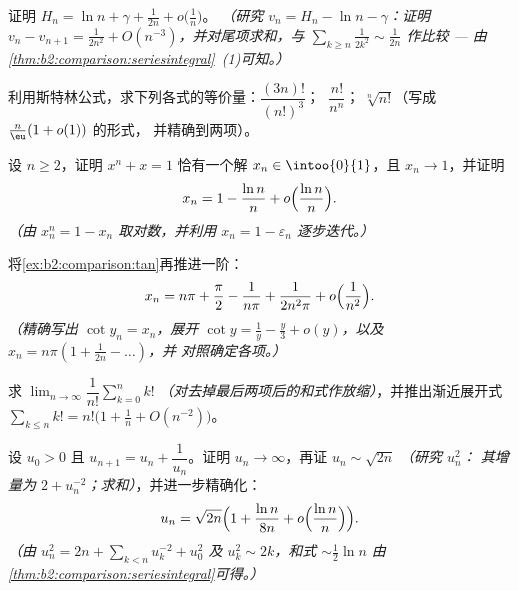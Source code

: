 \begin{exercise}[$\star\star$]\label{exo:b2:comparison:3}
证明 $H_n = \ln n + \gamma + \frac{1}{2n} + o\bigl(\frac1n\bigr)$。
\emph{（研究 $v_n = H_n - \ln n - \gamma$：证明 $v_n - v_{n+1} =
\frac{1}{2n^2} + O(n^{-3})$，并对尾项求和，与
$\sum_{k \geq n} \frac{1}{2k^2} \sim \frac{1}{2n}$ 作比较 ---
由\cref{thm:b2:comparison:seriesintegral}~(1)可知。）}
\end{exercise}

\begin{exercise}[$\star\star$]\label{exo:b2:comparison:4}
利用斯特林公式，求下列各式的等价量：$\dfrac{(3n)!}{(n!)^3}$；
$\;\dfrac{n!}{n^n}$；$\;\sqrt[n]{n!}$（写成 $\frac n\eu(1 + o(1))$ 的形式，
并精确到两项）。
\end{exercise}

\begin{exercise}[$\star\star$]\label{exo:b2:comparison:5}
设 $n \geq 2$，证明 $x^n + x = 1$ 恰有一个解 $x_n
\in \intoo{0}{1}$，且 $x_n \to 1$，并证明
\[
x_n = 1 - \frac{\ln n}{n} + o\Bigl(\frac{\ln n}{n}\Bigr).
\]
\emph{（由 $x_n^n = 1 - x_n$ 取对数，并利用
$x_n = 1 - \varepsilon_n$ 逐步迭代。）}
\end{exercise}

\begin{exercise}[$\star\star$]\label{exo:b2:comparison:6}
将\cref{ex:b2:comparison:tan}再推进一阶：
\[
x_n = n\pi + \frac\pi2 - \frac{1}{n\pi} + \frac{1}{2n^2\pi} +
o\Bigl(\frac{1}{n^2}\Bigr).
\]
\emph{（精确写出 $\cot y_n = x_n$，展开 $\cot y = \frac1y -
\frac y3 + o(y)$，以及 $x_n = n\pi(1 + \frac{1}{2n} - \dots)$，并
对照确定各项。）}
\end{exercise}

\begin{exercise}[$\star\star$]\label{exo:b2:comparison:7}
求 $\lim_{n\to\infty} \dfrac{1}{n!}\sum_{k=0}^{n} k!$
\emph{（对去掉最后两项后的和式作放缩）}，并推出渐近展开式
$\sum_{k \leq n} k! = n!\bigl(1 + \frac1n +
O(n^{-2})\bigr)$。
\end{exercise}

\begin{exercise}[$\star\star\star$]\label{exo:b2:comparison:8}
设 $u_0 > 0$ 且 $u_{n+1} = u_n + \dfrac{1}{u_n}$。证明 $u_n
\to \infty$，再证 $u_n \sim \sqrt{2n}$ \emph{（研究 $u_n^2$：
其增量为 $2 + u_n^{-2}$；求和）}，并进一步精确化：
\[
u_n = \sqrt{2n}\Bigl(1 + \frac{\ln n}{8n} +
o\Bigl(\frac{\ln n}{n}\Bigr)\Bigr).
\]
\emph{（由 $u_n^2 = 2n + \sum_{k<n} u_k^{-2} + u_0^2$ 及 $u_k^2
\sim 2k$，和式 $\sim \frac12\ln n$ 由
\cref{thm:b2:comparison:seriesintegral}可得。）}
\end{exercise}

